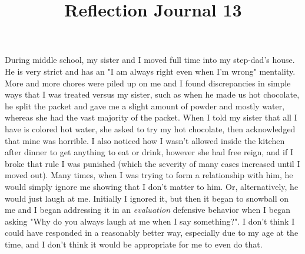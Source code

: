 \documentclass[12pt]{article}
\begin{document}
\title{Reflection Journal 13}

\par
During middle school, my sister and I moved full time into my step-dad's house. He is very strict and has an "I am always right even when I'm wrong" mentality. More and more chores were piled up on me and I found discrepancies in simple ways that I was treated versus my sister, such as when he made us hot chocolate, he split the packet and gave me a slight amount of powder and mostly water, whereas she had the vast majority of the packet. When I told my sister that all I have is colored hot water, she asked to try my hot chocolate, then acknowledged that mine was horrible. I also noticed how I wasn't allowed inside the kitchen after dinner to get anything to eat or drink, however she had free reign, and if I broke that rule I was punished (which the severity of many cases increased until I moved out). Many times, when I was trying to form a relationship with him, he would simply ignore me showing that I don't matter to him. Or, alternatively, he would just laugh at me. Initially I ignored it, but then it began to snowball on me and I began addressing it in an \emph{evaluation} defensive behavior when I began asking "Why do you always laugh at me when I say something?". I don't think I could have responded in a reasonably better way, especially due to my age at the time, and I don't think it would be appropriate for me to even do that.
\par
\end{document}
